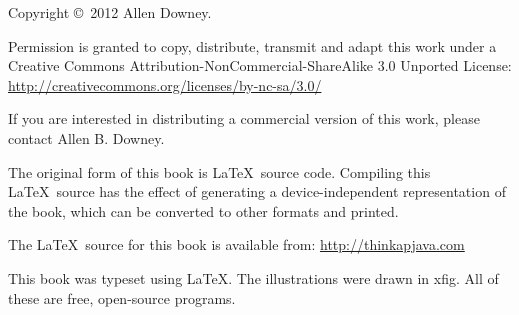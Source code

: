 \documentclass[12pt]{book}
\theoremstyle{exercise}
\begin{document}
\begin{latexonly}
Copyright \copyright ~2012 Allen Downey.

\vspace{0.25in}

Permission is granted to copy, distribute, transmit and adapt
this work under a Creative Commons
Attribution-NonCommercial-ShareAlike 3.0 Unported License:
\url{http://creativecommons.org/licenses/by-nc-sa/3.0/}

If you are interested in distributing a commercial version of this
work, please contact Allen B. Downey.

The original form of this book is \LaTeX\ source code.  Compiling this
\LaTeX\ source has the effect of generating a device-independent
representation of the book, which can be converted to other formats
and printed.

The \LaTeX\ source for this book is available from:
\url{http://thinkapjava.com}

This book was typeset using \LaTeX .  The illustrations were
drawn in xfig.  All of these are free, open-source programs.

\vspace{0.25in}



\end{latexonly}

\fi
\end{document}

